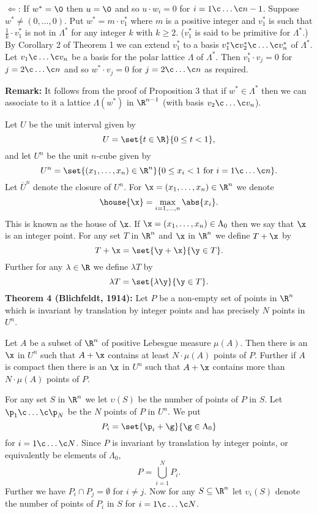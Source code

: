 $\Longleftarrow$: If $w^*=\0$ then $u=\0$ and so $u\cdot w_i=0$ for $i=1\c \dotsc\c n-1$.  Suppose $w^*\neq(0,\dotsc,0)$.  Put $w^*=m\cdot v^*_1$ where $m$ is a positive integer and $v^*_1$ is such that $\frac1k\cdot v^*_1$ is not in $\Lambda^*$ for any integer $k$ with $k\geq2$. ($v^*_1$ is said to be primitive for $\Lambda^*$.)  By Corollary 2 of Theorem 1 we can extend $v^*_1$ to a basis $v^*_1\c v^*_2\c \dotsc\c v^*_n$ of $\Lambda^*$.  Let $v_1\c \dotsc\c v_n$ be a basis for the polar lattice $\Lambda$ of $\Lambda^*$.  Then $v^*_1\cdot v_j=0$ for $j=2\c \dotsc\c n$ and so $w^*\cdot v_j=0$ for $j=2\c \dotsc\c n$ as required.

\textbf{Remark:} It follows from the proof of Proposition 3 that if $w^*\in\Lambda^*$ then we can associate to it a lattice $\Lambda(w^*)$ in $\R^{n-1}$ (with basis $v_2\c \dotsc\c v_n$).

Let $U$ be the unit interval given by
\[ U = \set{t\in\R}{0\leq t<1}, \]
and let $U^n$ be the unit $n$-cube given by
\[ U^n = \set{(x_1,\dotsc,x_n)\in\R^n}{0\leq x_i<1\text{ for }i=1\c \dotsc\c n} . \]
Let $\overline U^n$ denote the closure of $U^n$.  For $\x=(x_1,\dotsc,x_n)\in\R^n$ we denote
\[ \house{\x} = \max_{i=1,\dotsc,n}\abs{x_i} . \]
This is known as the house of $\x$.  If $\x=(x_1,\dotsc,x_n)\in\Lambda_0$ then we say that $\x$ is an integer point.  For any set $T$ in $\R^n$ and $\x$ in $\R^n$ we define $T+\x$ by
\[ T + \x = \set{\y+\x}{\y\in T} . \]
Further for any $\lambda\in\R$ we define $\lambda T$ by
\[ \lambda T = \set{\lambda\y}{\y\in T} . \]
\textbf{Theorem 4 (Blichfeldt, 1914):} Let $P$ be a non-empty set of points in $\R^n$ which is invariant by translation by integer points and has precisely $N$ points in $U^n$.

Let $A$ be a subset of $\R^n$ of positive Lebesgue measure $\mu(A)$.  Then there is an $\x$ in $U^n$ such that $A+\x$ contains at least $N\cdot\mu(A)$ points of $P$.  Further if $A$ is compact then there is an $\x$ in $U^n$ such that $A+\x$ contains more than $N\cdot\mu(A)$ points of $P$.

\pf For any set $S$ in $\R^n$ we let $\upsilon(S)$ be the number of points of $P$ in $S$.  Let $\p_1\c \dotsc\c \p_N$ be the $N$ points of $P$ in $U^n$.  We put
\[ P_i = \set{\p_i+\g}{\g\in\Lambda_0} \]
for $i=1\c \dotsc\c N$.  Since $P$ is invariant by translation by integer points, or equivalently be elements of $\Lambda_0$,
\[ P = \bigcup_{i=1}^N P_i . \]
Further we have $P_i\cap P_j=\emptyset$ for $i\neq j$.  Now for any $S\subseteq\R^n$ let $\upsilon_i(S)$ denote the number of points of $P_i$ in $S$ for $i=1\c \dotsc\c N$.

